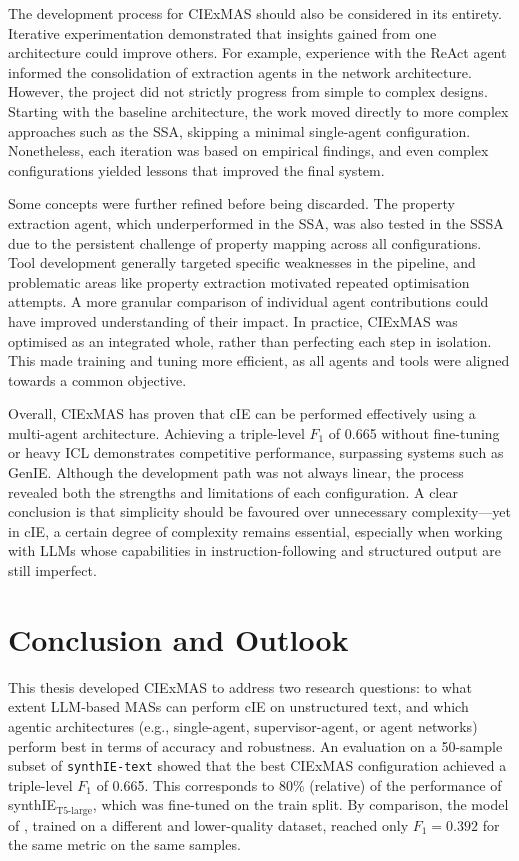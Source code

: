 \documentclass[a4paper,oneside,bibliography=totoc]{scrbook}
\begin{document}
The development process for CIExMAS should also be considered in its entirety. Iterative experimentation demonstrated that insights gained from one architecture could improve others. For example, experience with the ReAct agent informed the consolidation of extraction agents in the network architecture. However, the project did not strictly progress from simple to complex designs. Starting with the baseline architecture, the work moved directly to more complex approaches such as the \ac{SSA}, skipping a minimal single-agent configuration. Nonetheless, each iteration was based on empirical findings, and even complex configurations yielded lessons that improved the final system.

Some concepts were further refined before being discarded. The property extraction agent, which underperformed in the \ac{SSA}, was also tested in the \ac{SSSA} due to the persistent challenge of property mapping across all configurations. Tool development generally targeted specific weaknesses in the pipeline, and problematic areas like property extraction motivated repeated optimisation attempts. A more granular comparison of individual agent contributions could have improved understanding of their impact. In practice, CIExMAS was optimised as an integrated whole, rather than perfecting each step in isolation. This made training and tuning more efficient, as all agents and tools were aligned towards a common objective.

Overall, CIExMAS has proven that \ac{cIE} can be performed effectively using a multi-agent architecture. Achieving a triple-level $F_{1}$ of 0.665 without fine-tuning or heavy \ac{ICL} demonstrates competitive performance, surpassing systems such as GenIE. Although the development path was not always linear, the process revealed both the strengths and limitations of each configuration. A clear conclusion is that simplicity should be favoured over unnecessary complexity—yet in \ac{cIE}, a certain degree of complexity remains essential, especially when working with \acp{LLM} whose capabilities in instruction-following and structured output are still imperfect.

\chapter{Conclusion and Outlook}
\label{ch:conclusion_outlook}

This thesis developed CIExMAS to address two research questions: to what extent \ac{LLM}-based \acp{MAS} can perform \ac{cIE} on unstructured text, and which agentic architectures (e.g., single-agent, supervisor-agent, or agent networks) perform best in terms of accuracy and robustness. An evaluation on a 50-sample subset of \texttt{synthIE-text} showed that the best CIExMAS configuration achieved a triple-level $F_{1}$ of 0.665. This corresponds to 80\% (relative) of the performance of synthIE$_{\text{T5-large}}$, which was fine-tuned on the train split. By comparison, the model of \citet{Josifoski2021}, trained on a different and lower-quality dataset, reached only $F_{1}=0.392$ for the same metric on the same samples.
\end{document}
